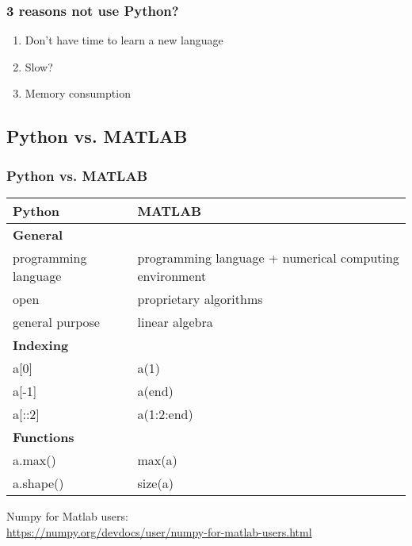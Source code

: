 \begin{frame}[c]
\frametitle{3 reasons not use Python?}


\begin{enumerate}
\item Don't have time to learn a new language
\item Slow? 
\item Memory consumption
\end{enumerate}

\end{frame}


\subsection{Python vs. MATLAB}

\begin{frame}[fragile]
\frametitle{Python vs. MATLAB}
\footnotesize

\begin{table}
\scriptsize
\begin{tabular}{p{}p{}}
\toprule
Python  	  				& MATLAB\\
\midrule
\textbf{General}			& \\
programming language		& programming language + numerical computing environment\\
open						& proprietary algorithms\\
general purpose				& linear algebra\\
\midrule
\textbf{Indexing} 			& 	\\
a[0]						& a(1) \\
a[-1]						& a(end)\\
a[::2]						& a(1:2:end)\\
\midrule
\textbf{Functions}			& \\
a.max()						& max(a)\\
a.shape()					& size(a)\\
\bottomrule
\end{tabular}
\end{table}

\vfill

Numpy for Matlab users:\\
\url{https://numpy.org/devdocs/user/numpy-for-matlab-users.html}

\end{frame}

